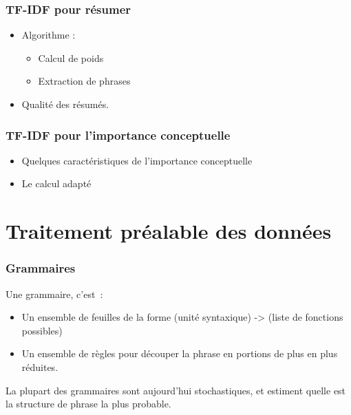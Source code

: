 \documentclass[12pt, handout]{beamer}
\begin{document}
\begin{frame}
 \frametitle{TF-IDF pour résumer}
 \begin{itemize}
  \item Algorithme :
  	\begin{itemize}
  	\item Calcul de poids
  	\item Extraction de phrases
  	\end{itemize}
  \item Qualité des résumés.
 \end{itemize}
 
\end{frame}

\begin{frame}
 \frametitle{TF-IDF pour l'importance conceptuelle}
 \begin{itemize}
  	\item Quelques caractéristiques de l'importance conceptuelle
  	\item Le calcul adapté
  \end{itemize}
 
\end{frame}

\section{Traitement préalable des données}



\begin{frame}
 \frametitle{Grammaires}
 Une grammaire, c'est~:
 \begin{itemize}
  \item Un ensemble de feuilles de la forme (unité syntaxique) -> (liste de fonctions possibles)
  \item Un ensemble de règles pour découper la phrase en portions de plus en plus réduites.
 \end{itemize}
 La plupart des grammaires sont aujourd'hui stochastiques, et estiment quelle est la structure de phrase la plus probable.
 
\end{frame}
\end{document}
